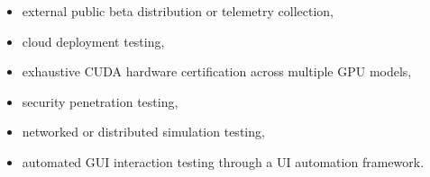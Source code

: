 \begin{itemize}[nosep]
	\item external public beta distribution or telemetry collection,
	\item cloud deployment testing,
	\item exhaustive CUDA hardware certification across multiple GPU models,
	\item security penetration testing,
	\item networked or distributed simulation testing,
	\item automated GUI interaction testing through a UI automation framework.
\end{itemize}
